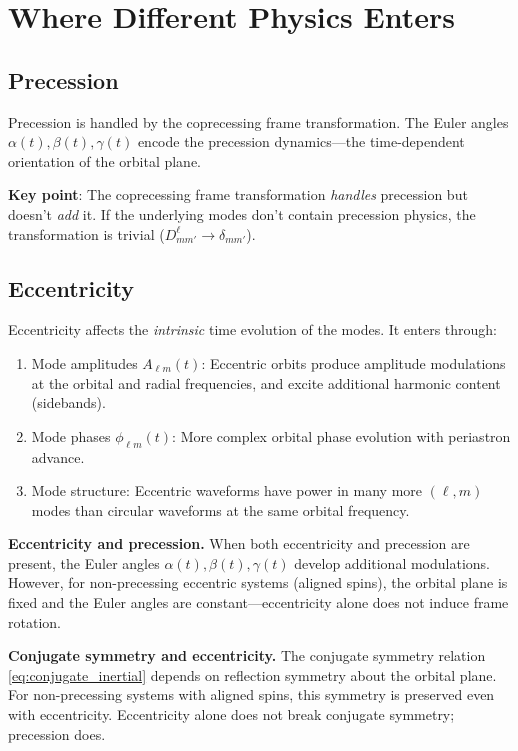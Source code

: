 \documentclass[11pt,a4paper]{article}
\newcommand{\Alm}{A_{\ell m}}
\newcommand{\philm}{\phi_{\ell m}}
\begin{document}
\section{Where Different Physics Enters}

\subsection{Precession}

Precession is handled by the coprecessing frame transformation. The Euler angles $\alpha(t), \beta(t), \gamma(t)$ encode the precession dynamics---the time-dependent orientation of the orbital plane.

\textbf{Key point}: The coprecessing frame transformation \emph{handles} precession but doesn't \emph{add} it. If the underlying modes don't contain precession physics, the transformation is trivial ($D^\ell_{m m'} \to \delta_{mm'}$).

\subsection{Eccentricity}

Eccentricity affects the \emph{intrinsic} time evolution of the modes. It enters through:
\begin{enumerate}
    \item Mode amplitudes $\Alm(t)$: Eccentric orbits produce amplitude modulations at the orbital and radial frequencies, and excite additional harmonic content (sidebands).
    \item Mode phases $\philm(t)$: More complex orbital phase evolution with periastron advance.
    \item Mode structure: Eccentric waveforms have power in many more $(\ell, m)$ modes than circular waveforms at the same orbital frequency.
\end{enumerate}

\textbf{Eccentricity and precession.} When both eccentricity and precession are present, the Euler angles $\alpha(t), \beta(t), \gamma(t)$ develop additional modulations. However, for non-precessing eccentric systems (aligned spins), the orbital plane is fixed and the Euler angles are constant---eccentricity alone does not induce frame rotation.

\textbf{Conjugate symmetry and eccentricity.} The conjugate symmetry relation \eqref{eq:conjugate_inertial} depends on reflection symmetry about the orbital plane. For non-precessing systems with aligned spins, this symmetry is preserved even with eccentricity. Eccentricity alone does not break conjugate symmetry; precession does.
\end{document}
